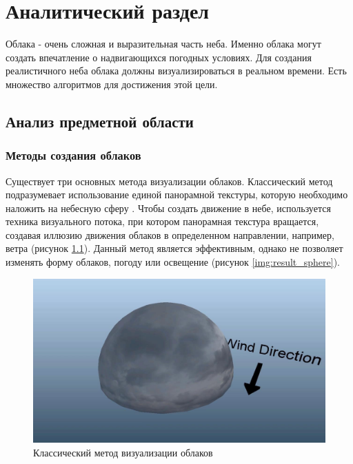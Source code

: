 \chapter{Аналитический раздел}
\label{cha:analysis}

Облака - очень сложная и выразительная часть неба. Именно облака могут создать впечатление
о надвигающихся погодных условиях.
Для создания реалистичного неба облака должны визуализироваться в реальном времени.
Есть множество алгоритмов для достижения этой цели.

\section{Анализ предметной области}

\subsection{Методы создания облаков}

Существует три основных метода визуализации облаков. Классический метод подразумевает использование единой панорамной текстуры,
которую необходимо наложить на небесную сферу \cite{Gue14}. Чтобы создать движение в небе, используется техника визуального
потока, при котором панорамная текстура вращается, создавая иллюзию движения облаков в определенном направлении, например,
ветра (рисунок \ref{img:cloud_sphere}). Данный метод является эффективным, однако не позволяет изменять форму облаков, погоду или освещение
(рисунок \ref{img:result_sphere}).

\begin{figure}[H]
    \centering
    \includegraphics[scale=0.4]{img/cloud_sphere.png}
    \caption{Классический метод визуализации облаков}
    \label{img:cloud_sphere}
\end{figure}


